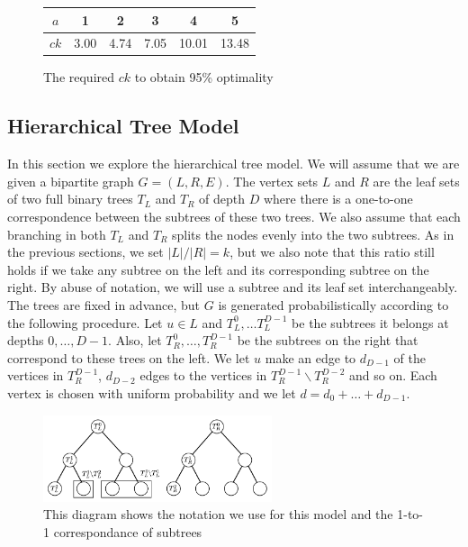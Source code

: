 \begin{figure}[h]
  \centering
  \begin{tabular}{ |c|c|c|c|c|c| }
    \hline
    $a$ & 1 & 2 & 3 & 4 & 5 \\ \hline
    $ck$ & 3.00 & 4.74 & 7.05 & 10.01 & 13.48 \\
    \hline
  \end{tabular}
  \caption{The required $ck$ to obtain 95\% optimality}
\end{figure}

\subsection{Hierarchical Tree Model}
\label{hierarchy}
In this section we explore the hierarchical tree model. We will assume
that we are given a bipartite graph $G=(L,R,E)$. The vertex sets $L$
and $R$ are the leaf sets of two full binary trees $T_L$ and $T_R$ of
depth $D$ where there is a one-to-one correspondence between the
subtrees of these two trees. We also assume that each branching in
both $T_L$ and $T_R$ splits the nodes evenly into the two
subtrees. As in the previous sections, we set $|L|/|R|=k$, but we also
note that this ratio still holds if we take any subtree on the left 
and its corresponding subtree on the right. By abuse of notation, we 
will use a subtree and its leaf set interchangeably. The trees are
fixed in advance, but $G$ is generated probabilistically according to
the following procedure. Let $u\in L$ and $T_L^0, \ldots T^{D-1}_L$ be
the subtrees it belongs at depths $0,\ldots, D-1$. Also, let 
$T_R^0,\ldots, T_R^{D-1}$ be the subtrees on the right that correspond
to these trees on the left. We let $u$ make an edge to $d_{D-1}$ of
the vertices in $T_{R}^{D-1}$, $d_{D-2}$ edges to the vertices in 
$T_{R}^{D-1} \backslash T_{R}^{D-2}$ and so on. Each vertex is chosen
with uniform probability and we let $d = d_{0} + \ldots + d_{D-1}$.\vs

\begin{figure}[h]
\centering
\includegraphics[width=0.6\textwidth]{hierarchy_tree.png}
\begin{minipage}[h]{0.7\textwidth}
\caption{This diagram shows the notation we use for this model and the 1-to-1 correspondance of subtrees}
\end{minipage}
\end{figure}

